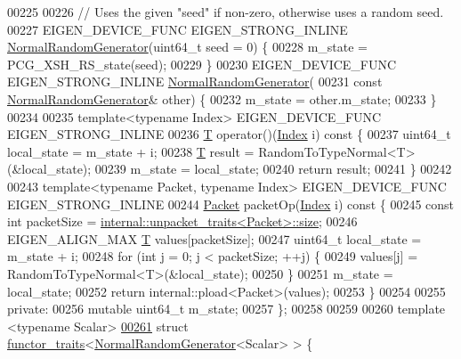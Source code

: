 \begin{DoxyCode}
00225 
00226   \textcolor{comment}{// Uses the given "seed" if non-zero, otherwise uses a random seed.}
00227   EIGEN\_DEVICE\_FUNC EIGEN\_STRONG\_INLINE \hyperlink{class_eigen_1_1internal_1_1_normal_random_generator}{NormalRandomGenerator}(uint64\_t seed = 0) \{
00228     m\_state = PCG\_XSH\_RS\_state(seed);
00229   \}
00230   EIGEN\_DEVICE\_FUNC EIGEN\_STRONG\_INLINE \hyperlink{class_eigen_1_1internal_1_1_normal_random_generator}{NormalRandomGenerator}(
00231       \textcolor{keyword}{const} \hyperlink{class_eigen_1_1internal_1_1_normal_random_generator}{NormalRandomGenerator}& other) \{
00232     m\_state = other.m\_state;
00233   \}
00234 
00235  \textcolor{keyword}{template}<\textcolor{keyword}{typename} Index> EIGEN\_DEVICE\_FUNC EIGEN\_STRONG\_INLINE
00236   \hyperlink{group___sparse_core___module}{T} operator()(\hyperlink{namespace_eigen_a62e77e0933482dafde8fe197d9a2cfde}{Index} i)\textcolor{keyword}{ const }\{
00237     uint64\_t local\_state = m\_state + i;
00238     \hyperlink{group___sparse_core___module}{T} result = RandomToTypeNormal<T>(&local\_state);
00239     m\_state = local\_state;
00240     \textcolor{keywordflow}{return} result;
00241   \}
00242 
00243   \textcolor{keyword}{template}<\textcolor{keyword}{typename} Packet, \textcolor{keyword}{typename} Index> EIGEN\_DEVICE\_FUNC EIGEN\_STRONG\_INLINE
00244   \hyperlink{union_eigen_1_1internal_1_1_packet}{Packet} packetOp(\hyperlink{namespace_eigen_a62e77e0933482dafde8fe197d9a2cfde}{Index} i)\textcolor{keyword}{ const }\{
00245     \textcolor{keyword}{const} \textcolor{keywordtype}{int} packetSize = \hyperlink{struct_eigen_1_1internal_1_1unpacket__traits}{internal::unpacket\_traits<Packet>::size};
00246     EIGEN\_ALIGN\_MAX \hyperlink{group___sparse_core___module}{T} values[packetSize];
00247     uint64\_t local\_state = m\_state + i;
00248     \textcolor{keywordflow}{for} (\textcolor{keywordtype}{int} j = 0; j < packetSize; ++j) \{
00249       values[j] = RandomToTypeNormal<T>(&local\_state);
00250     \}
00251     m\_state = local\_state;
00252     \textcolor{keywordflow}{return} internal::pload<Packet>(values);
00253   \}
00254 
00255  \textcolor{keyword}{private}:
00256   \textcolor{keyword}{mutable} uint64\_t m\_state;
00257 \};
00258 
00259 
00260 \textcolor{keyword}{template} <\textcolor{keyword}{typename} Scalar>
\hyperlink{struct_eigen_1_1internal_1_1functor__traits_3_01_normal_random_generator_3_01_scalar_01_4_01_4}{00261} \textcolor{keyword}{struct }\hyperlink{struct_eigen_1_1internal_1_1functor__traits}{functor\_traits}<\hyperlink{class_eigen_1_1internal_1_1_normal_random_generator}{NormalRandomGenerator}<Scalar> > \{

\end{DoxyCode}
